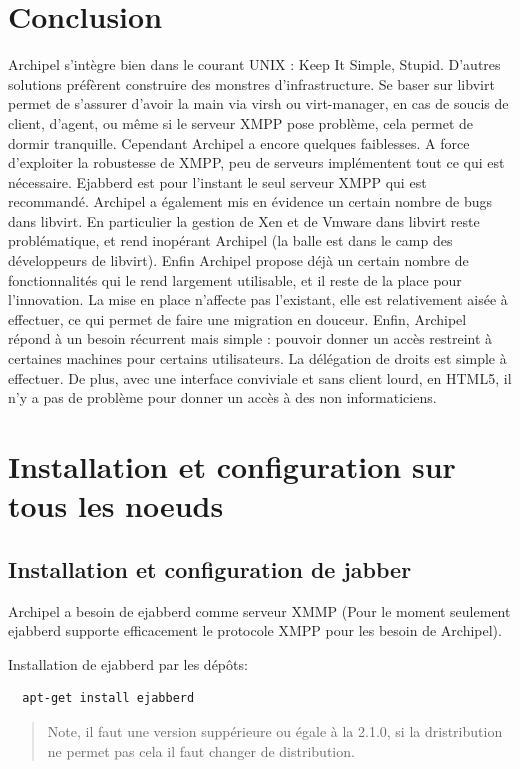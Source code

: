     \section{Conclusion}
Archipel s'intègre bien dans le courant UNIX : Keep It Simple, Stupid. D'autres solutions préfèrent
construire des monstres d'infrastructure. Se baser sur libvirt permet de s'assurer d'avoir la main via virsh
ou virt-manager, en cas de soucis de client, d'agent, ou même si le serveur XMPP pose problème, cela
permet de dormir tranquille.\newline
Cependant Archipel a encore quelques faiblesses. A force d'exploiter la robustesse de XMPP, peu de
serveurs implémentent tout ce qui est nécessaire. Ejabberd est pour l'instant le seul serveur XMPP qui est
recommandé. Archipel a également mis en évidence un certain nombre de bugs dans libvirt. En particulier
la gestion de Xen et de Vmware dans libvirt reste problématique, et rend inopérant Archipel (la balle est
dans le camp des développeurs de libvirt). Enfin Archipel propose déjà un certain nombre de
fonctionnalités qui le rend largement utilisable, et il reste de la place pour l'innovation.\newline
La mise en place n'affecte pas l'existant, elle est relativement aisée à effectuer, ce qui permet de faire
une migration en douceur.\newline
Enfin, Archipel répond à un besoin récurrent mais simple : pouvoir donner un accès restreint à certaines
machines pour certains utilisateurs. La délégation de droits est simple à effectuer. De plus, avec une
interface conviviale et sans client lourd, en HTML5, il n'y a pas de problème pour donner un accès à des
non informaticiens.

    \section{Installation et configuration sur tous les noeuds}
	\subsection{Installation et configuration de jabber}
Archipel a besoin de ejabberd comme serveur XMMP (Pour le moment seulement ejabberd supporte efficacement le protocole XMPP pour les
besoin de Archipel). 

Installation de ejabberd par les dépôts:
\begin{lstlisting}
  apt-get install ejabberd
\end{lstlisting}
\begin{quotation}
Note, il faut une version suppérieure ou égale à la 2.1.0, si la dristribution ne permet pas cela il faut changer de distribution.
\end{quotation}

